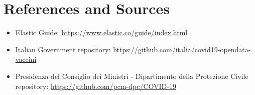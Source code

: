 \documentclass{article}
\begin{document}
\section{References and Sources}
\begin{itemize}
    \item Elastic Guide: \url{https://www.elastic.co/guide/index.html}
    \item Italian Government repository: \url{https://github.com/italia/covid19-opendata-vaccini}
    \item Presidenza del Consiglio dei Ministri - Dipartimento della Protezione Civile repository:
    \url{https://github.com/pcm-dpc/COVID-19}
\end{itemize}
\end{document}
